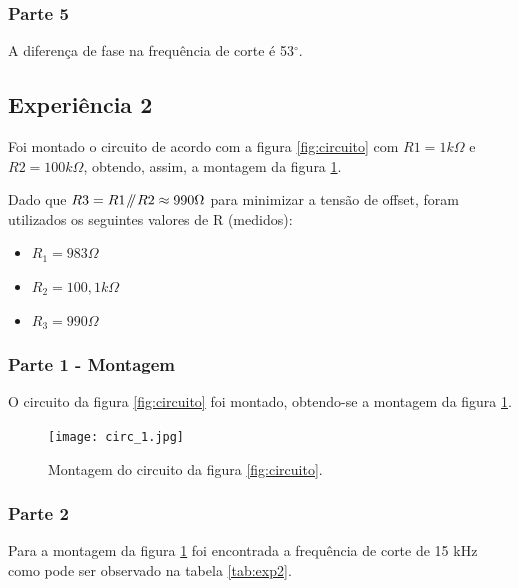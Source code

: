 \documentclass{abntex2}
\newcommand{\parallelsum}{\mathbin{\!/\mkern-5mu/\!}}
\begin{document}
\subsubsection{Parte 5}
A diferença de fase na frequência de corte é 53$^\circ$.


\subsection{Experiência 2}

Foi montado o circuito de acordo com a figura \ref{fig:circuito} com $R1 = 1k\Omega$ e $R2 = 100k\Omega$, obtendo, assim, a montagem da figura \ref{fig:montagem2}.

Dado que $R3 = R1 \parallelsum R2 \approx 990 \Omega$ para minimizar a tensão de offset, foram utilizados os seguintes valores de R (medidos):

\begin{itemize}
  \item $R_1 = 983\Omega$
  \item $R_2 = 100,1k\Omega$
  \item $R_3 = 990\Omega$
\end{itemize}

\subsubsection{Parte 1 - Montagem}

O circuito da figura \ref{fig:circuito} foi montado, obtendo-se a montagem da figura \ref{fig:montagem2}.

\begin{figure}[h]
  \centering
  \texttt{[image: circ\_1.jpg]}
  \caption{Montagem do circuito da figura \ref{fig:circuito}.}
  \label{fig:montagem2}
\end{figure}

\subsubsection{Parte 2}

Para a montagem da figura \ref{fig:montagem2} foi encontrada a frequência de corte de 15 kHz como pode ser observado na tabela \ref{tab:exp2}.
\end{document}
